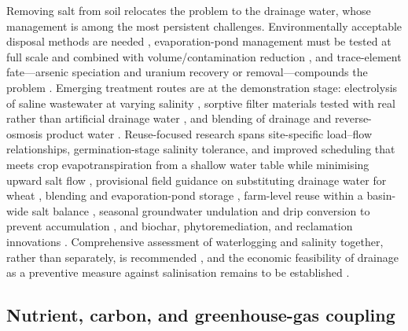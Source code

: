 Removing salt from soil relocates the problem to the drainage water, whose
management is among the most persistent challenges. Environmentally acceptable
disposal methods are needed \parencite{Ayars2014,Steppuhn2006}, evaporation-pond
management must be tested at full scale and combined with volume/contamination
reduction \parencite{BRADFORD1991}, and trace-element fate---arsenic speciation and
uranium recovery or removal---compounds the problem
\parencite{Gao2007,Duff1997,Gao2003}. Emerging treatment routes are at the
demonstration stage: electrolysis of saline wastewater at varying salinity
\parencite{Yang2023}, sorptive filter materials tested with real rather than
artificial drainage water \parencite{Pugliese2023}, and blending of drainage and
reverse-osmosis product water \parencite{Singh2020d}. Reuse-focused research spans
site-specific load--flow relationships, germination-stage salinity tolerance, and
improved scheduling that meets crop evapotranspiration from a shallow water table
while minimising upward salt flow \parencite{WESTCOT1988}, provisional field
guidance on substituting drainage water for wheat \parencite{Sharma1998}, blending
and evaporation-pond storage \parencite{Datta2002}, farm-level reuse within a
basin-wide salt balance \parencite{Qureshi2008}, seasonal groundwater undulation
and drip conversion to prevent accumulation \parencite{Mirlas2021,Dou2022,Singh2019},
and biochar, phytoremediation, and reclamation innovations
\parencite{Liu2025f,Steppuhn2017,Youngs2000}. Comprehensive assessment of
waterlogging and salinity together, rather than separately, is recommended
\parencite{Valipour2014}, and the economic feasibility of drainage as a preventive
measure against salinisation remains to be established
\parencite{Datta2000,HalbacCotoaraZamfir2022}.

\subsection{Nutrient, carbon, and greenhouse-gas coupling}

